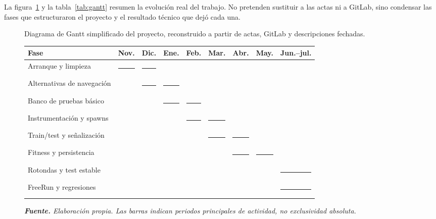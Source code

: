 La figura~\ref{fig:gantt-proyecto} y la tabla~\ref{tab:gantt} resumen la evolución real del trabajo. No pretenden sustituir a las actas ni a GitLab, sino condensar las fases que estructuraron el proyecto y el resultado técnico que dejó cada una.

\begin{figure}[htbp]
\centering
\caption[Diagrama de Gantt del proyecto.]{Diagrama de Gantt simplificado del proyecto, reconstruido a partir de actas, GitLab y descripciones fechadas.}%
\label{fig:gantt-proyecto}
\scriptsize
\setlength{\tabcolsep}{3pt}
\begin{tabular}{L{3.5cm}cccccccc}
\toprule
\textbf{Fase} & \textbf{Nov.} & \textbf{Dic.} & \textbf{Ene.} & \textbf{Feb.} & \textbf{Mar.} & \textbf{Abr.} & \textbf{May.} & \textbf{Jun.--jul.}\\
\midrule
Arranque y limpieza & \rule{0.55cm}{0.16cm} & \rule{0.55cm}{0.16cm} & & & & & &\\
Alternativas de navegación & & \rule{0.55cm}{0.16cm} & \rule{0.55cm}{0.16cm} & & & & &\\
Banco de pruebas básico & & & \rule{0.55cm}{0.16cm} & \rule{0.55cm}{0.16cm} & & & &\\
Instrumentación y spawns & & & & \rule{0.55cm}{0.16cm} & \rule{0.55cm}{0.16cm} & & &\\
Train/test y señalización & & & & & \rule{0.55cm}{0.16cm} & \rule{0.55cm}{0.16cm} & &\\
Fitness y persistencia & & & & & & \rule{0.55cm}{0.16cm} & \rule{0.55cm}{0.16cm} &\\
Rotondas y test estable & & & & & & & & \rule{0.55cm}{0.16cm}\\
FreeRun y regresiones & & & & & & & & \rule{0.55cm}{0.16cm}\\
\bottomrule
\end{tabular}
\caption*{\textit{\textbf{Fuente.} Elaboración propia. Las barras indican periodos principales de actividad, no exclusividad absoluta.}}
\end{figure}

